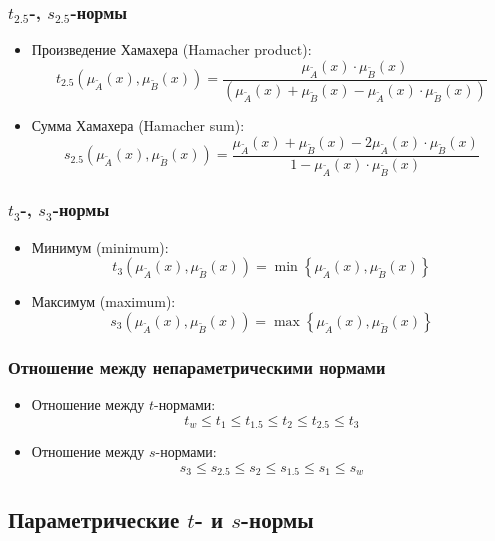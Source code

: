 \documentclass{beamer}
\begin{document}
\begin{frame}\frametitle{$t_{2.5}$-, $s_{2.5}$-нормы}
    \begin{itemize}
        \item Произведение Хамахера (Hamacher product):
        \[
            t_{2.5}(\mu_{\tilde{A}}(x), \mu_{\tilde{B}}(x)) = 
                \frac{\mu_{\tilde{A}}(x) \cdot \mu_{\tilde{B}}(x)}{(\mu_{\tilde{A}}(x) + \mu_{\tilde{B}}(x) - \mu_{\tilde{A}}(x) \cdot \mu_{\tilde{B}}(x))}
        \]
        \item Сумма Хамахера (Hamacher sum):
        \[
            s_{2.5}(\mu_{\tilde{A}}(x), \mu_{\tilde{B}}(x)) = \frac{\mu_{\tilde{A}}(x) + \mu_{\tilde{B}}(x) - 2 \mu_{\tilde{A}}(x) \cdot \mu_{\tilde{B}}(x)}{1 - \mu_{\tilde{A}}(x) \cdot \mu_{\tilde{B}}(x)}
        \]
    \end{itemize}
\end{frame}

\begin{frame}\frametitle{$t_{3}$-, $s_{3}$-нормы}
    \begin{itemize}
        \item Минимум (minimum):
        \[
            t_{3}(\mu_{\tilde{A}}(x), \mu_{\tilde{B}}(x)) = \min{\left\{ \mu_{\tilde{A}}(x), \mu_{\tilde{B}}(x) \right\}}
        \]
        \item Максимум (maximum):
        \[
            s_{3}(\mu_{\tilde{A}}(x), \mu_{\tilde{B}}(x)) = \max{\left\{ \mu_{\tilde{A}}(x), \mu_{\tilde{B}}(x) \right\}}
        \]
    \end{itemize}
\end{frame}

\begin{frame}\frametitle{Отношение между непараметрическими нормами}
    \begin{itemize}
        \item Отношение между $t$-нормами:
        \[
            t_{w} \leq t_1 \leq t_{1.5} \leq t_2 \leq t_{2.5} \leq t_3
        \]
        \item Отношение между $s$-нормами:
        \[
            s_{3} \leq s_{2.5} \leq s_{2} \leq s_{1.5} \leq s_{1} \leq s_w
        \]
    \end{itemize}
\end{frame}

\subsection{Параметрические $t$- и $s$-нормы}
\end{document}
